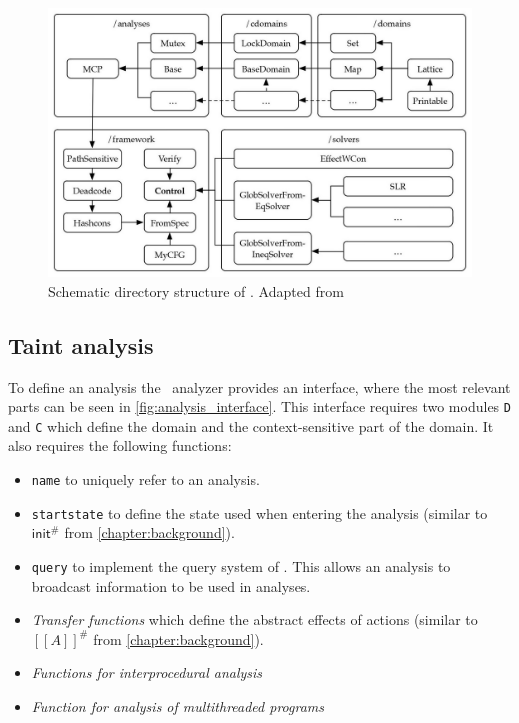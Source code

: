   \begin{figure}
    \centering
    \includegraphics{../figures/goblint_structure_detailed.jpg}
    \caption{Schematic directory structure of \gob. Adapted from \parencite{apinis2014frameworks}}
    \label{fig:gob_structure_detail}
  \end{figure}

    \subsection{Taint analysis}\label{sec:implTaint}
      To define an analysis the \gob\ analyzer provides an interface, where the most relevant parts can be seen in \autoref{fig:analysis_interface}. This interface requires two modules \texttt{D} and \texttt{C} which define the domain and the context-sensitive part of the domain. It also requires the following functions: 
      \begin{itemize}
        \item \texttt{name} to uniquely refer to an analysis.
        \item \texttt{startstate} to define the state used when entering the analysis (similar to $\textsf{init}^{\#}$ from \autoref{chapter:background}).
        \item \texttt{query} to implement the query system of \gob. This allows an analysis to broadcast information to be used in analyses.
        \item \textit{Transfer functions} which define the abstract effects of actions (similar to $[\![A]\!]^{\#}$ from \autoref{chapter:background}).
        \item \textit{Functions for interprocedural analysis}
        \item \textit{Function for analysis of multithreaded programs}
      \end{itemize}


